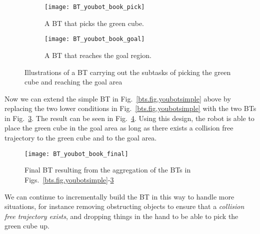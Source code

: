 \begin{figure}[ht!]
    \centering

    \begin{subfigure}[t]{\columnwidth}
        \centering
\texttt{[image: BT\_youbot\_book\_pick]}
   \caption{A BT that picks the green cube. }
   \label{bts.fig.youbotpick}
    \end{subfigure}
    
      \begin{subfigure}[t]{\columnwidth}
        \centering
\texttt{[image: BT\_youbot\_book\_goal]}
   \caption{A BT that reaches the goal region.}
      \label{bts.fig.youbotmove}
    \end{subfigure}
    \vspace{1em}
    \caption{Illustrations of a BT carrying out the subtasks of picking the green cube and reaching the goal area}
    \label{bts.fig.youbotpickmove}
\end{figure}


Now we can extend the simple BT in Fig.~\ref{bts.fig.youbotsimple} above by replacing the two lower conditions in Fig.~\ref{bts.fig.youbotsimple}
with the two BTs in Fig.~\ref{bts.fig.youbotpickmove}.
The result can be seen  in Fig.~\ref{bts.fig.youbotfinal}. Using this design, the robot is able to place the green cube in the goal area as long as there exists a collision free trajectory to the green cube and to the goal area. 


\begin{figure}[h]
\centering
\texttt{[image: BT\_youbot\_book\_final]}
\caption{Final BT resulting from the aggregation of the BTs in Figs.~\ref{bts.fig.youbotsimple}-\ref{bts.fig.youbotpickmove}}
\label{bts.fig.youbotfinal}
\end{figure}



We can continue to incrementally build the BT in this way to handle more situations, for instance removing obstructing objects to ensure that a \emph{collision free trajectory exists}, and dropping things in the hand to be able to pick the green cube up. 

